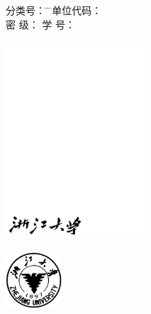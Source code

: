 
\thispagestyle{empty}

\begin{tabbing}
\Songti\xiaosi 分类号： \= \underline{\makebox[4cm]{\xiaosi\zjuclass}} \= \hspace{4cm} \= \Songti\xiaosi 单位代码：\underline{} \\
\Songti\xiaosi 密 \quad 级： \> \underline{\makebox[4cm]{\zjusecurity}} \> \> \Songti\xiaosi 学 \quad\quad 号：\underline{\makebox[3cm]{\zjuauthorid}}
\end{tabbing}

\vspace{5mm}

\begin{center}
   \includegraphics[width=52mm]{images/zjdx}%
\end{center}


\vspace{4mm}

\begin{center}
  \includegraphics[width=21mm]{images/standxb.png}%
\end{center}

\vspace{8mm}

